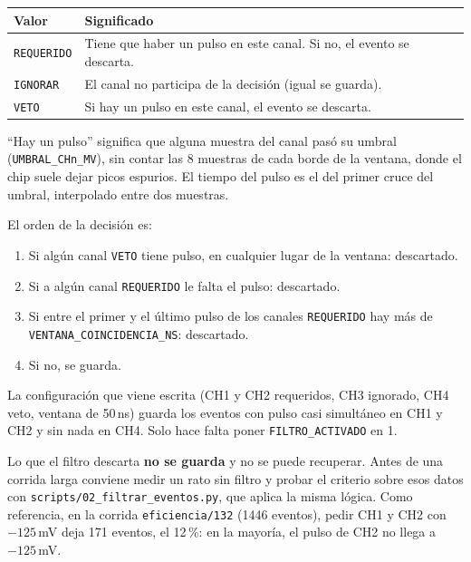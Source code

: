 \documentclass[11pt,a4paper]{article}
\newcommand{\code}[1]{\texttt{#1}}
\begin{document}
\begin{center}
\begin{tabular}{lp{11cm}}
\toprule
Valor & Significado \\
\midrule
\code{REQUERIDO} & Tiene que haber un pulso en este canal. Si no, el evento se descarta. \\
\code{IGNORAR} & El canal no participa de la decisión (igual se guarda). \\
\code{VETO} & Si hay un pulso en este canal, el evento se descarta. \\
\bottomrule
\end{tabular}
\end{center}

``Hay un pulso'' significa que alguna muestra del canal pasó su umbral
(\code{UMBRAL\_CHn\_MV}), sin contar las 8 muestras de cada borde de la ventana,
donde el chip suele dejar picos espurios. El tiempo del pulso es el del primer cruce
del umbral, interpolado entre dos muestras.

El orden de la decisión es:

\begin{enumerate}[itemsep=2pt]
  \item Si algún canal \code{VETO} tiene pulso, en cualquier lugar de la ventana:
        descartado.
  \item Si a algún canal \code{REQUERIDO} le falta el pulso: descartado.
  \item Si entre el primer y el último pulso de los canales \code{REQUERIDO} hay más
        de \code{VENTANA\_COINCIDENCIA\_NS}: descartado.
  \item Si no, se guarda.
\end{enumerate}

La configuración que viene escrita (CH1 y CH2 requeridos, CH3 ignorado, CH4 veto,
ventana de 50\,ns) guarda los eventos con pulso casi simultáneo en CH1 y CH2 y sin
nada en CH4. Solo hace falta poner \code{FILTRO\_ACTIVADO} en 1.

\begin{aviso}
Lo que el filtro descarta \textbf{no se guarda} y no se puede recuperar. Antes de una
corrida larga conviene medir un rato sin filtro y probar el criterio sobre esos
datos con \code{scripts/02\_filtrar\_eventos.py}, que aplica la misma lógica. Como
referencia, en la corrida \code{eficiencia/132} (1446 eventos), pedir CH1 y CH2 con
$-125$\,mV deja 171 eventos, el 12\,\%: en la mayoría, el pulso de CH2 no llega a
$-125$\,mV.
\end{aviso}
\end{document}
